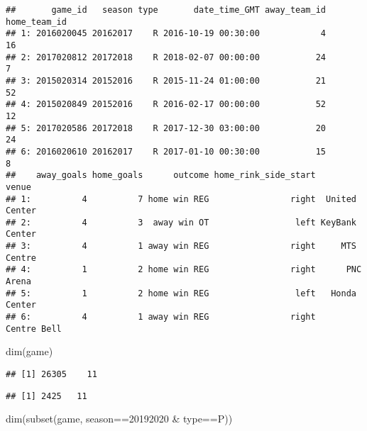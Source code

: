 \documentclass[
]{article}
\newenvironment{Shaded}{\begin{snugshade}}{\end{snugshade}}
\newcommand{\DecValTok}[1]{\textcolor[rgb]{0.00,0.00,0.81}{#1}}
\newcommand{\FunctionTok}[1]{\textcolor[rgb]{0.00,0.00,0.00}{#1}}
\newcommand{\NormalTok}[1]{#1}
\newcommand{\SpecialCharTok}[1]{\textcolor[rgb]{0.00,0.00,0.00}{#1}}
\newcommand{\StringTok}[1]{\textcolor[rgb]{0.31,0.60,0.02}{#1}}
\begin{document}
\begin{verbatim}
##       game_id   season type       date_time_GMT away_team_id home_team_id
## 1: 2016020045 20162017    R 2016-10-19 00:30:00            4           16
## 2: 2017020812 20172018    R 2018-02-07 00:00:00           24            7
## 3: 2015020314 20152016    R 2015-11-24 01:00:00           21           52
## 4: 2015020849 20152016    R 2016-02-17 00:00:00           52           12
## 5: 2017020586 20172018    R 2017-12-30 03:00:00           20           24
## 6: 2016020610 20162017    R 2017-01-10 00:30:00           15            8
##    away_goals home_goals      outcome home_rink_side_start          venue
## 1:          4          7 home win REG                right  United Center
## 2:          4          3  away win OT                 left KeyBank Center
## 3:          4          1 away win REG                right     MTS Centre
## 4:          1          2 home win REG                right      PNC Arena
## 5:          1          2 home win REG                 left   Honda Center
## 6:          4          1 away win REG                right    Centre Bell
\end{verbatim}

\begin{Shaded}
\begin{Highlighting}[]
\FunctionTok{dim}\NormalTok{(game)}
\end{Highlighting}
\end{Shaded}

\begin{verbatim}
## [1] 26305    11
\end{verbatim}

\begin{Shaded}
\end{Shaded}

\begin{verbatim}
## [1] 2425   11
\end{verbatim}

\begin{Shaded}
\begin{Highlighting}[]
\FunctionTok{dim}\NormalTok{(}\FunctionTok{subset}\NormalTok{(game, season}\SpecialCharTok{==}\DecValTok{20192020} \SpecialCharTok{\&}\NormalTok{ type}\SpecialCharTok{==}\StringTok{\textquotesingle{}P\textquotesingle{}}\NormalTok{))}
\end{Highlighting}
\end{Shaded}
\end{document}
